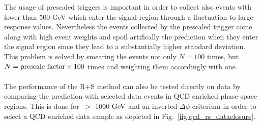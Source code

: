 The usage of prescaled triggers is important in order to collect also events with \HT lower than 500 GeV which enter the signal region through a fluctuation to large response values. Nevertheless the events collected by the prescaled trigger come along with high event weights and spoil artifically the prediction when they enter the signal region since they lead to a substantially higher standard deviation. This problem is solved by smearing the events not only $N = 100$ times, but $N = \rm{prescale~factor} \times 100$ times and weighting them accordingly with one.\\
\\
The performance of the R+S method can also be tested directly on data by comparing the prediction with selected data events in QCD enriched phase-space regions. This is done for \HT~$>~1000~\rm{GeV}$ and an inverted $\Delta \phi$ criterium in order to select a QCD enriched data sample as depicted in Fig.~\ref{fig:qcd_rs_dataclosure}. 
